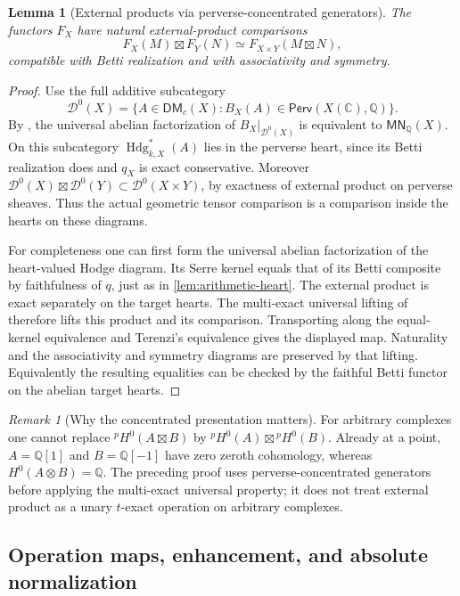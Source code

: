 \documentclass[11pt]{article}
\numberwithin{equation}{section}
\newtheorem{lemma}[lemma]{Lemma}
\theoremstyle{definition}
\theoremstyle{remark}
\newtheorem{remark}[remark]{Remark}
\newcommand{\Q}{\mathbb Q}
\newcommand{\C}{\mathbb C}
\newcommand{\MN}{\mathsf{MN}}
\newcommand{\Perv}{\mathsf{Perv}}
\newcommand{\pH}{{}^{p}\!H}
\begin{document}
\begin{lemma}[External products via perverse-concentrated generators]
\label{lem:perverse-tensor-lift}
The functors $F_X$ have natural external-product comparisons
\[
 F_X(M)\boxtimes F_Y(N)\simeq F_{X\times Y}(M\boxtimes N),
\]
compatible with Betti realization and with associativity and symmetry.
\end{lemma}
\begin{proof}
Use the full additive subcategory
\[
 \mathcal D^0(X)=\{A\in\mathsf{DM}_c(X):B_X(A)\in\Perv(X(\C),\Q)\}.
\]
By \cite[Theorem~1.12]{Terenzi}, the universal abelian factorization of
$B_X|_{\mathcal D^0(X)}$ is equivalent to $\MN_\Q(X)$. On this
subcategory $\operatorname{Hdg}_{k,X}^*(A)$ lies in the perverse heart,
since its Betti realization does and $q_X$ is exact conservative.
Moreover $\mathcal D^0(X)\boxtimes\mathcal D^0(Y)\subset
\mathcal D^0(X\times Y)$, by exactness of external product on
perverse sheaves. Thus the actual geometric tensor comparison is a
comparison inside the hearts on these diagrams.

For completeness one can first form the universal abelian factorization
of the heart-valued Hodge diagram. Its Serre kernel equals that of its
Betti composite by faithfulness of $q$, just as in
\cref{lem:arithmetic-heart}. The external product is exact separately
on the target hearts. The multi-exact universal lifting of
\cite[Proposition~4.3, Corollary~4.5 and Proposition~4.6]{TerenziFunctoriality}
therefore lifts this product and its comparison. Transporting along the
equal-kernel equivalence and Terenzi's equivalence gives the displayed
map. Naturality and the associativity and symmetry diagrams are preserved
by that lifting. Equivalently the resulting equalities can be checked by
the faithful Betti functor on the abelian target hearts.
\end{proof}

\begin{remark}[Why the concentrated presentation matters]
For arbitrary complexes one cannot replace
$\pH^0(A\boxtimes B)$ by $\pH^0(A)\boxtimes\pH^0(B)$.
Already at a point, $A=\Q[1]$ and $B=\Q[-1]$ have zero zeroth
cohomology, whereas $H^0(A\otimes B)=\Q$. The preceding proof
uses perverse-concentrated generators before applying the multi-exact
universal property; it does not treat external product as a unary
$t$-exact operation on arbitrary complexes.
\end{remark}

\subsection{Operation maps, enhancement, and absolute normalization}
\end{document}
